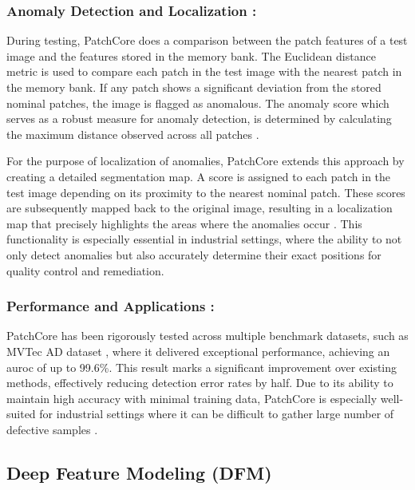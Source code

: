 \subsubsection*{Anomaly Detection and Localization :}

During testing, PatchCore does a comparison between the patch features of a test image and the features stored in the memory bank. The Euclidean distance metric is used to compare each patch in the test image with the nearest patch in the memory bank. If any patch shows a significant deviation from the stored nominal patches, the image is flagged as anomalous. The anomaly score which serves as a robust measure for anomaly detection, is determined by calculating the maximum distance observed across all patches \cite{roth2022totalrecallindustrialanomaly}.

For the purpose of localization of anomalies, PatchCore extends this approach by creating a detailed segmentation map. A score is assigned to each patch in the test image depending on its proximity to the nearest nominal patch. These scores are subsequently mapped back to the original image, resulting in a localization map that precisely highlights the areas where the anomalies occur \cite{roth2022totalrecallindustrialanomaly}. This functionality is especially essential in industrial settings, where the ability to not only detect anomalies but also accurately determine their exact positions for quality control and remediation.

\subsubsection*{Performance and Applications :}

PatchCore has been rigorously tested across multiple benchmark datasets, such as MVTec AD dataset \cite{8954181}, where it delivered exceptional performance, achieving an \gls{auroc} of up to 99.6\%. This result marks a significant improvement over existing methods, effectively reducing detection error rates by half. Due to its ability to maintain high accuracy with minimal training data, PatchCore is especially well-suited for industrial settings where it can be difficult to gather large number of defective samples \cite{roth2022totalrecallindustrialanomaly}.

\subsection{Deep Feature Modeling (DFM)}
\label{subsec:dfm}

